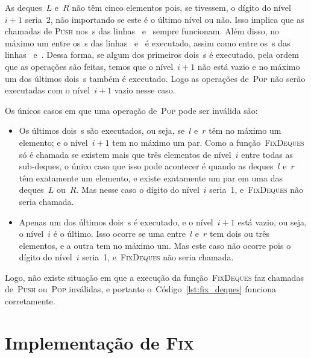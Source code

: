 \documentclass[../../main.tex]{subfiles}
\begin{document}
As deques~$L$ e~$R$ não têm cinco elementos pois, se tivessem, o dígito do nível~$i+1$ seria~2, não importando se este é o último nível ou não. Isso implica que as chamadas de \textsc{Push} nos~s das linhas~ e~ sempre funcionam. Além disso, no máximo um entre os~s das linhas~ e~ é executado, assim como entre os~s das linhas~ e~. Dessa forma, se algum dos primeiros dois~s é executado, pela ordem que as operações são feitas, temos que o nível~$i+1$ não está vazio e no máximo um dos últimos dois~s também é executado. Logo as operações de~\textsc{Pop} não serão executadas com o nível~$i+1$ vazio nesse caso.

Os únicos casos em que uma operação de~\textsc{Pop} pode ser inválida são:
\begin{itemize}
    \item Os últimos dois~s são executados, ou seja, se~$l$ e~$r$ têm no máximo um elemento; e o nível~$i+1$ tem no máximo um par. Como a função~\textsc{FixDeques} só é chamada se existem mais que três elementos de nível~$i$ entre todas as sub-deques, o único caso que isso pode acontecer é quando as deques~$l$ e~$r$ têm exatamente um elemento, e existe exatamente um par em uma das deques~$L$ ou~$R$. Mas nesse caso o dígito do nível~$i$ seria~1, e~\textsc{FixDeques} não seria chamada.
    \item Apenas um dos últimos dois~s é executado, e o nível~$i+1$ está vazio, ou seja, o nível~$i$ é o último. Isso ocorre se uma entre~$l$ e~$r$ tem dois ou três elementos, e a outra tem no máximo um. Mas este caso não ocorre pois o dígito do nível~$i$ seria~1, e~\textsc{FixDeques} não seria chamada.
\end{itemize}

Logo, não existe situação em que a execução da função~\textsc{FixDeques} faz chamadas de~\textsc{Push} ou~\textsc{Pop} inválidas, e portanto o~Código~\ref{lst:fix_deques} funciona corretamente.

\section{Implementação de {\normalfont \textsc{Fix}}}
\end{document}
